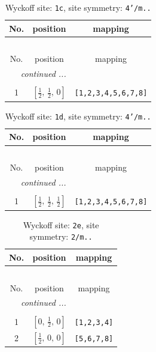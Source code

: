 \documentclass[fleqn,8pt]{jsarticle}
\begin{document}
\begin{longtable}{ccc}
\caption{Wyckoff site: {\tt 1c}, site symmetry: {\tt 4'/m..}}
 \\
 \hline \hline
No. & position & mapping \\ \hline \endfirsthead

\multicolumn{2}{l}{\tablename\ \thetable{}} \\
 \hline \hline
No. & position & mapping \\ \hline \endhead

 \hline \hline
\multicolumn{2}{r}{\footnotesize\it continued ...} \\ \endfoot

 \hline \hline
\multicolumn{2}{r}{} \\ \endlastfoot

1 & $\left[ \frac{1}{2},\, \frac{1}{2},\, 0 \right]$ & {\tt [1,2,3,4,5,6,7,8]} \\
\end{longtable}
\renewcommand{\arraystretch}{1.2}
\begin{longtable}{ccc}
\caption{Wyckoff site: {\tt 1d}, site symmetry: {\tt 4'/m..}}
 \\
 \hline \hline
No. & position & mapping \\ \hline \endfirsthead

\multicolumn{2}{l}{\tablename\ \thetable{}} \\
 \hline \hline
No. & position & mapping \\ \hline \endhead

 \hline \hline
\multicolumn{2}{r}{\footnotesize\it continued ...} \\ \endfoot

 \hline \hline
\multicolumn{2}{r}{} \\ \endlastfoot

1 & $\left[ \frac{1}{2},\, \frac{1}{2},\, \frac{1}{2} \right]$ & {\tt [1,2,3,4,5,6,7,8]} \\
\end{longtable}
\renewcommand{\arraystretch}{1.2}
\begin{longtable}{ccc}
\caption{Wyckoff site: {\tt 2e}, site symmetry: {\tt 2/m..}}
 \\
 \hline \hline
No. & position & mapping \\ \hline \endfirsthead

\multicolumn{2}{l}{\tablename\ \thetable{}} \\
 \hline \hline
No. & position & mapping \\ \hline \endhead

 \hline \hline
\multicolumn{2}{r}{\footnotesize\it continued ...} \\ \endfoot

 \hline \hline
\multicolumn{2}{r}{} \\ \endlastfoot

1 & $\left[ 0,\, \frac{1}{2},\, 0 \right]$ & {\tt [1,2,3,4]} \\ \hline
2 & $\left[ \frac{1}{2},\, 0,\, 0 \right]$ & {\tt [5,6,7,8]} \\
\end{longtable}
\end{document}
